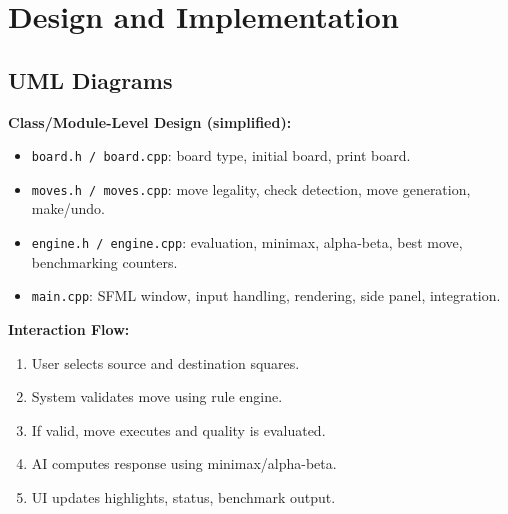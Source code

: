 \documentclass[12pt,a4paper]{article}
\begin{document}
\section{Design and Implementation}
\subsection{UML Diagrams}
\textbf{Class/Module-Level Design (simplified):}
\begin{itemize}
    \item \texttt{board.h / board.cpp}: board type, initial board, print board.
    \item \texttt{moves.h / moves.cpp}: move legality, check detection, move generation, make/undo.
    \item \texttt{engine.h / engine.cpp}: evaluation, minimax, alpha-beta, best move, benchmarking counters.
    \item \texttt{main.cpp}: SFML window, input handling, rendering, side panel, integration.
\end{itemize}

\textbf{Interaction Flow:}
\begin{enumerate}
    \item User selects source and destination squares.
    \item System validates move using rule engine.
    \item If valid, move executes and quality is evaluated.
    \item AI computes response using minimax/alpha-beta.
    \item UI updates highlights, status, benchmark output.
\end{enumerate}
\end{document}
